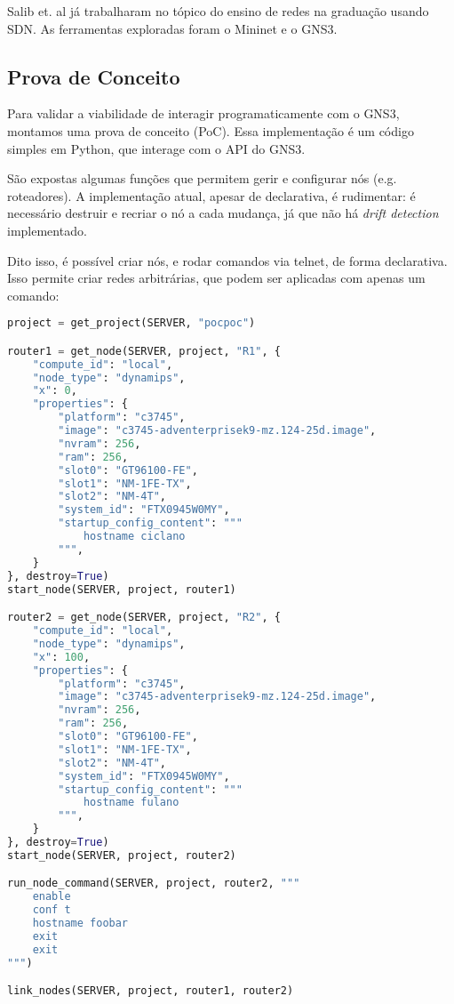 \documentclass[12pt]{article}
\begin{document}
Salib et. al\cite{salib2018hands} já trabalharam no tópico do ensino de redes
na graduação usando SDN. As ferramentas exploradas foram o
Mininet\cite{mininet} e o GNS3\cite{gns3api}.



\subsection{Prova de Conceito}

Para validar a viabilidade de interagir programaticamente com o GNS3, montamos
uma prova de conceito (PoC). Essa implementação é um código simples em Python,
que interage com o API do GNS3\cite{gns3api}.

São expostas algumas funções que permitem gerir e configurar nós (e.g.
roteadores). A implementação atual, apesar de declarativa, é rudimentar: é
necessário destruir e recriar o nó a cada mudança, já que não há \textit{drift
detection} implementado.

Dito isso, é possível criar nós, e rodar comandos via telnet, de forma
declarativa. Isso permite criar redes arbitrárias, que podem ser aplicadas com
apenas um comando:

\begin{lstlisting}[language=Python]
project = get_project(SERVER, "pocpoc")

router1 = get_node(SERVER, project, "R1", {
    "compute_id": "local",
    "node_type": "dynamips",
    "x": 0,
    "properties": {
        "platform": "c3745",
        "image": "c3745-adventerprisek9-mz.124-25d.image",
        "nvram": 256,
        "ram": 256, 
        "slot0": "GT96100-FE",
        "slot1": "NM-1FE-TX",
        "slot2": "NM-4T",
        "system_id": "FTX0945W0MY",
        "startup_config_content": """
            hostname ciclano
        """,
    }
}, destroy=True)
start_node(SERVER, project, router1)

router2 = get_node(SERVER, project, "R2", {
    "compute_id": "local",
    "node_type": "dynamips",
    "x": 100,
    "properties": {
        "platform": "c3745",
        "image": "c3745-adventerprisek9-mz.124-25d.image",
        "nvram": 256,
        "ram": 256, 
        "slot0": "GT96100-FE",
        "slot1": "NM-1FE-TX",
        "slot2": "NM-4T",
        "system_id": "FTX0945W0MY",
        "startup_config_content": """
            hostname fulano
        """,
    }
}, destroy=True)
start_node(SERVER, project, router2)

run_node_command(SERVER, project, router2, """
    enable
    conf t
    hostname foobar
    exit
    exit
""")

link_nodes(SERVER, project, router1, router2)
\end{lstlisting}
\end{document}
